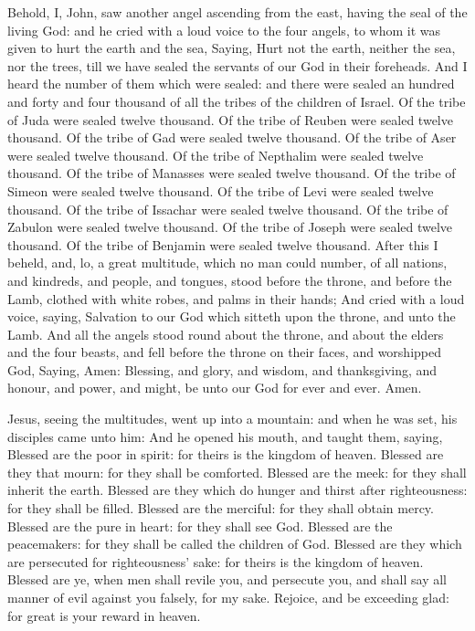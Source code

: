 
 Behold, I, John, saw another angel ascending from the east, having the seal of the living God: and he cried with a loud voice to the four angels, to whom it was given to hurt the earth and the sea, Saying, Hurt not the earth, neither the sea, nor the trees, till we have sealed the servants of our God in their foreheads. And I heard the number of them which were sealed: and there were sealed an hundred and forty and four thousand of all the tribes of the children of Israel. Of the tribe of Juda were sealed twelve thousand. Of the tribe of Reuben were sealed twelve thousand. Of the tribe of Gad were sealed twelve thousand. Of the tribe of Aser were sealed twelve thousand. Of the tribe of Nepthalim were sealed twelve thousand. Of the tribe of Manasses were sealed twelve thousand. Of the tribe of Simeon were sealed twelve thousand. Of the tribe of Levi were sealed twelve thousand. Of the tribe of Issachar were sealed twelve thousand. Of the tribe of Zabulon were sealed twelve thousand. Of the tribe of Joseph were sealed twelve thousand. Of the tribe of Benjamin were sealed twelve thousand. After this I beheld, and, lo, a great multitude, which no man could number, of all nations, and kindreds, and people, and tongues, stood before the throne, and before the Lamb, clothed with white robes, and palms in their hands; And cried with a loud voice, saying, Salvation to our God which sitteth upon the throne, and unto the Lamb. And all the angels stood round about the throne, and about the elders and the four beasts, and fell before the throne on their faces, and worshipped God, Saying, Amen: Blessing, and glory, and wisdom, and thanksgiving, and honour, and power, and might, be unto our God for ever and ever. Amen.

 Jesus, seeing the multitudes, went up into a mountain: and when he was set, his disciples came unto him: And he opened his mouth, and taught them, saying, Blessed are the poor in spirit: for theirs is the kingdom of heaven. Blessed are they that mourn: for they shall be comforted. Blessed are the meek: for they shall inherit the earth. Blessed are they which do hunger and thirst after righteousness: for they shall be filled. Blessed are the merciful: for they shall obtain mercy. Blessed are the pure in heart: for they shall see God. Blessed are the peacemakers: for they shall be called the children of God. Blessed are they which are persecuted for righteousness' sake: for theirs is the kingdom of heaven. Blessed are ye, when men shall revile you, and persecute you, and shall say all manner of evil against you falsely, for my sake. Rejoice, and be exceeding glad: for great is your reward in heaven.



